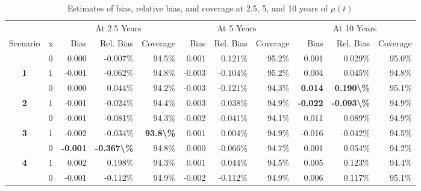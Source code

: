 \begin{table}

\caption{Estimates of bias, relative bias, and coverage at 2.5, 5, and 10 years of $\mu(t)$}
\centering
\begin{tabular}[t]{>{}ccrrrrrrrrr}
\toprule
\multicolumn{2}{c}{ } & \multicolumn{3}{c}{At 2.5 Years} & \multicolumn{3}{c}{At 5 Years} & \multicolumn{3}{c}{At 10 Years} \\
\cmidrule(l{3pt}r{3pt}){3-5} \cmidrule(l{3pt}r{3pt}){6-8} \cmidrule(l{3pt}r{3pt}){9-11}
Scenario & x & Bias & Rel. Bias & Coverage & Bias & Rel. Bias & Coverage & Bias & Rel. Bias & Coverage\\
\midrule
 & 0 & 0.000 & -0.007\% & 94.5\% & 0.001 & 0.121\% & 95.2\% & 0.001 & 0.029\% & 95.0\%\\

\multirow[t]{-2}{*}{\centering\arraybackslash \textbf{1}} & 1 & -0.001 & -0.062\% & 94.8\% & -0.003 & -0.104\% & 95.2\% & 0.004 & 0.045\% & 94.8\%\\

 & 0 & 0.000 & 0.044\% & 94.2\% & -0.003 & -0.121\% & 94.3\% & \textbf{ 0.014} & \textbf{ 0.190\textbackslash{}\%} & 95.1\%\\

\multirow[t]{-2}{*}{\centering\arraybackslash \textbf{2}} & 1 & -0.001 & -0.024\% & 94.4\% & 0.003 & 0.038\% & 94.9\% & \textbf{-0.022} & \textbf{-0.093\textbackslash{}\%} & 94.9\%\\

 & 0 & -0.001 & -0.081\% & 94.3\% & -0.002 & -0.041\% & 94.1\% & 0.011 & 0.089\% & 94.9\%\\

\multirow[t]{-2}{*}{\centering\arraybackslash \textbf{3}} & 1 & -0.002 & -0.034\% & \textbf{93.8\textbackslash{}\%} & 0.001 & 0.004\% & 94.9\% & -0.016 & -0.042\% & 94.5\%\\

\rule{0pt}{4ex}
 & 0 & \textbf{-0.001} & \textbf{-0.367\textbackslash{}\%} & 94.8\% & 0.000 & -0.066\% & 94.7\% & 0.001 & 0.054\% & 94.2\%\\

\multirow[t]{-2}{*}{\centering\arraybackslash \textbf{4}} & 1 & 0.002 & 0.198\% & 94.3\% & 0.001 & 0.044\% & 94.5\% & 0.005 & 0.123\% & 94.4\%\\

 & 0 & -0.001 & -0.112\% & 94.9\% & -0.002 & -0.112\% & 94.9\% & 0.006 & 0.117\% & 95.1\%\\


\end{tabular}
\end{table}
